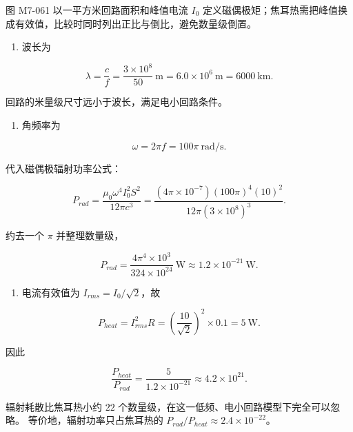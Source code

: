 图 M7-061 以一平方米回路面积和峰值电流 \(I_0\)
定义磁偶极矩；焦耳热需把峰值换成有效值，比较时同时列出正比与倒比，避免数量级倒置。

\begin{enumerate}
\def\labelenumi{(\arabic{enumi})}
\tightlist
\item
  波长为
\end{enumerate}

\[
\lambda=\frac cf
=\frac{3\times10^8}{50}\ \mathrm m
=6.0\times10^6\ \mathrm m
=6000\ \mathrm{km}.
\]

回路的米量级尺寸远小于波长，满足电小回路条件。

\begin{enumerate}
\def\labelenumi{(\arabic{enumi})}
\setcounter{enumi}{1}
\tightlist
\item
  角频率为
\end{enumerate}

\[
\omega=2\pi f=100\pi\ \mathrm{rad/s}.
\]

代入磁偶极辐射功率公式：

\[
P_{rad}
=\frac{\mu_0\omega^4I_0^2S^2}{12\pi c^3}
=\frac{(4\pi\times10^{-7})(100\pi)^4(10)^2}
{12\pi(3\times10^8)^3}.
\]

约去一个 \(\pi\) 并整理数量级，

\[
P_{rad}
=\frac{4\pi^4\times10^3}{324\times10^{24}}\ \mathrm W
\approx1.2\times10^{-21}\ \mathrm W.
\]

\begin{enumerate}
\def\labelenumi{(\arabic{enumi})}
\setcounter{enumi}{2}
\tightlist
\item
  电流有效值为 \(I_{rms}=I_0/\sqrt2\)，故
\end{enumerate}

\[
P_{heat}=I_{rms}^2R
=\left(\frac{10}{\sqrt2}\right)^2\times0.1
=5\ \mathrm W.
\]

因此

\[
\frac{P_{heat}}{P_{rad}}
=\frac5{1.2\times10^{-21}}
\approx4.2\times10^{21}.
\]

辐射耗散比焦耳热小约 \(22\)
个数量级，在这一低频、电小回路模型下完全可以忽略。
等价地，辐射功率只占焦耳热的
\(P_{rad}/P_{heat}\approx2.4\times10^{-22}\)。


